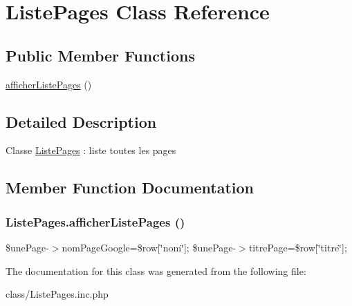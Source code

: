 \hypertarget{class_liste_pages}{
\section{ListePages Class Reference}
\label{class_liste_pages}
}
\subsection*{Public Member Functions}
\begin{DoxyCompactItemize}
\item 
\hyperlink{class_liste_pages_a74651261be0d35d8b0939ed64a690fe0}{afficherListePages} ()
\end{DoxyCompactItemize}


\subsection{Detailed Description}
Classe \hyperlink{class_liste_pages}{ListePages} : liste toutes les pages 

\subsection{Member Function Documentation}
\hypertarget{class_liste_pages_a74651261be0d35d8b0939ed64a690fe0}{
\subsubsection[{afficherListePages}]{\setlength{\rightskip}{0pt plus 5cm}ListePages.afficherListePages ()}}
\label{class_liste_pages_a74651261be0d35d8b0939ed64a690fe0}


\$unePage-\/$>$nomPageGoogle=\$row\mbox{[}\char`\"{}nom\char`\"{}\mbox{]}; \$unePage-\/$>$titrePage=\$row\mbox{[}\char`\"{}titre\char`\"{}\mbox{]}; 

The documentation for this class was generated from the following file:\begin{DoxyCompactItemize}
\item 
class/ListePages.inc.php\end{DoxyCompactItemize}
